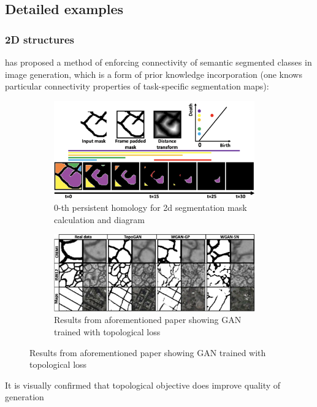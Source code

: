 \subsection*{Detailed examples}
\subsubsection{2D structures}
\cite{topo-segm} has proposed a method of enforcing connectivity of semantic segmented classes in image generation, which is a form of prior knowledge incorporation (one knows particular connectivity properties of task-specific segmentation maps):
\begin{figure}[h]
\centering
\begin{subfigure}{0.5\textwidth}
  \centering
  \includegraphics[width=0.95\textwidth]{images/toposurfconcept.png}
  \caption{0-th persistent homology for 2d segmentation mask calculation and diagram}
  \label{fig:toposurfconcept}
\end{subfigure}%
\begin{subfigure}{0.5\textwidth}
  \centering
  \includegraphics[width=0.95\textwidth]{images/toposurfres.png}
  \caption{Results from aforementioned paper showing GAN trained with topological loss}
  \label{fig:toposurfres}
\end{subfigure}
\end{figure}
It is visually confirmed that topological objective does improve quality of generation

